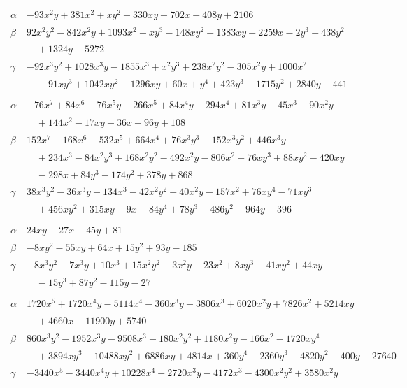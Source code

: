\documentclass[11pt]{article}
\begin{document}
\begin{longtable}{@{}ll@{}}
$\alpha$ & $-93x^{2}y+381x^{2}+xy^{2}+330xy-702x-408y+2106$\\
$\beta$ & $92x^{2}y^{2}-842x^{2}y+1093x^{2}-xy^{3}-148xy^{2}-1383xy+2259x-2y^{3}-438y^{2}$\\
 & $\quad +1324y-5272$\\
$\gamma$ & $-92x^{3}y^{2}+1028x^{3}y-1855x^{3}+x^{2}y^{3}+238x^{2}y^{2}-305x^{2}y+1000x^{2}$\\
 & $\quad -91xy^{3}+1042xy^{2}-1296xy+60x+y^{4}+423y^{3}-1715y^{2}+2840y-441$\\
\addlinespace[3pt]
\multicolumn{2}{@{}l}{$\{i,j\}=\{21,155\}$, $k_{ij}=2^{2}\cdot 3^{4}$}\\
$\alpha$ & $-76x^{7}+84x^{6}-76x^{5}y+266x^{5}+84x^{4}y-294x^{4}+81x^{3}y-45x^{3}-90x^{2}y$\\
 & $\quad +144x^{2}-17xy-36x+96y+108$\\
$\beta$ & $152x^{7}-168x^{6}-532x^{5}+664x^{4}+76x^{3}y^{3}-152x^{3}y^{2}+446x^{3}y$\\
 & $\quad +234x^{3}-84x^{2}y^{3}+168x^{2}y^{2}-492x^{2}y-806x^{2}-76xy^{3}+88xy^{2}-420xy$\\
 & $\quad -298x+84y^{3}-174y^{2}+378y+868$\\
$\gamma$ & $38x^{3}y^{2}-36x^{3}y-134x^{3}-42x^{2}y^{2}+40x^{2}y-157x^{2}+76xy^{4}-71xy^{3}$\\
 & $\quad +456xy^{2}+315xy-9x-84y^{4}+78y^{3}-486y^{2}-964y-396$\\
\addlinespace[3pt]
\multicolumn{2}{@{}l}{$\{i,j\}=\{21,209\}$, $k_{ij}=3^{5}$}\\
$\alpha$ & $24xy-27x-45y+81$\\
$\beta$ & $-8xy^{2}-55xy+64x+15y^{2}+93y-185$\\
$\gamma$ & $-8x^{3}y^{2}-7x^{3}y+10x^{3}+15x^{2}y^{2}+3x^{2}y-23x^{2}+8xy^{3}-41xy^{2}+44xy$\\
 & $\quad -15y^{3}+87y^{2}-115y-27$\\
\addlinespace[3pt]
\multicolumn{2}{@{}l}{$\{i,j\}=\{22,23\}$, $k_{ij}=2^{4}\cdot 3\cdot 5^{4}$}\\
$\alpha$ & $1720x^{5}+1720x^{4}y-5114x^{4}-360x^{3}y+3806x^{3}+6020x^{2}y+7826x^{2}+5214xy$\\
 & $\quad +4660x-11900y+5740$\\
$\beta$ & $860x^{3}y^{2}-1952x^{3}y-9508x^{3}-180x^{2}y^{2}+1180x^{2}y-166x^{2}-1720xy^{4}$\\
 & $\quad +3894xy^{3}-10488xy^{2}+6886xy+4814x+360y^{4}-2360y^{3}+4820y^{2}-400y-27640$\\
$\gamma$ & $-3440x^{5}-3440x^{4}y+10228x^{4}-2720x^{3}y-4172x^{3}-4300x^{2}y^{2}+3580x^{2}y$\\

\end{longtable}
\end{document}
